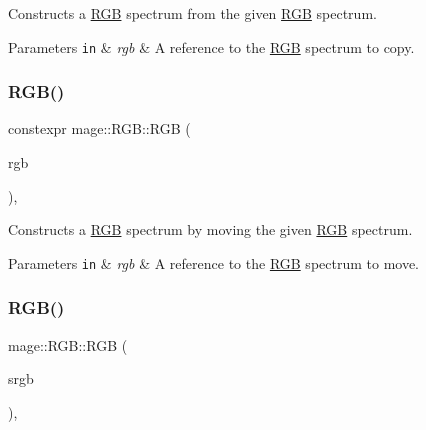 Constructs a \mbox{\hyperlink{structmage_1_1_r_g_b}{R\+GB}} spectrum from the given \mbox{\hyperlink{structmage_1_1_r_g_b}{R\+GB}} spectrum.


\begin{DoxyParams}[1]{Parameters}
\mbox{\tt in}  & {\em rgb} & A reference to the \mbox{\hyperlink{structmage_1_1_r_g_b}{R\+GB}} spectrum to copy. \\
\hline
\end{DoxyParams}
\mbox{\label{structmage_1_1_r_g_b_a852c4ed04bb38c7913d12fc491185bfb}} 
\subsubsection{\texorpdfstring{R\+G\+B()}{RGB()}\hspace{0.1cm}{\footnotesize\ttfamily [4/7]}}
{\footnotesize\ttfamily constexpr mage\+::\+R\+G\+B\+::\+R\+GB (\begin{DoxyParamCaption}\item[{\mbox{\hyperlink{structmage_1_1_r_g_b}{R\+GB}} \&\&}]{rgb }\end{DoxyParamCaption})\hspace{0.3cm}{\ttfamily [default]}, {\ttfamily [noexcept]}}

Constructs a \mbox{\hyperlink{structmage_1_1_r_g_b}{R\+GB}} spectrum by moving the given \mbox{\hyperlink{structmage_1_1_r_g_b}{R\+GB}} spectrum.


\begin{DoxyParams}[1]{Parameters}
\mbox{\tt in}  & {\em rgb} & A reference to the \mbox{\hyperlink{structmage_1_1_r_g_b}{R\+GB}} spectrum to move. \\
\hline
\end{DoxyParams}
\mbox{\label{structmage_1_1_r_g_b_a2f2c4eea3b0c44e0f31cfe20c6371d64}} 
\subsubsection{\texorpdfstring{R\+G\+B()}{RGB()}\hspace{0.1cm}{\footnotesize\ttfamily [5/7]}}
{\footnotesize\ttfamily mage\+::\+R\+G\+B\+::\+R\+GB (\begin{DoxyParamCaption}\item[{const \mbox{\hyperlink{structmage_1_1_s_r_g_b}{S\+R\+GB}} \&}]{srgb }\end{DoxyParamCaption})\hspace{0.3cm}{\ttfamily [explicit]}, {\ttfamily [noexcept]}}


